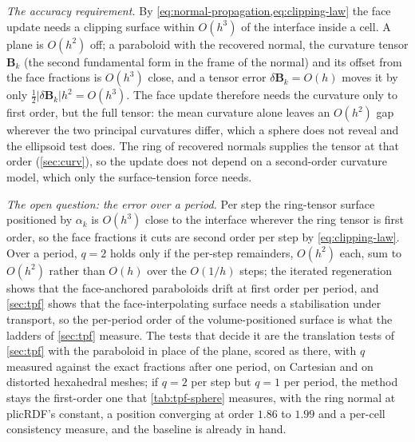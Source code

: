 \documentclass[preprint,12pt]{elsarticle}
\begin{document}
\emph{The accuracy requirement.} By \cref{eq:normal-propagation,eq:clipping-law} the face update needs a clipping surface within $O(h^3)$ of the interface inside a cell. A plane is $O(h^2)$ off; a paraboloid with the recovered normal, the curvature tensor $\mathbf{B}_k$ (the second fundamental form in the frame of the normal) and its offset from the face fractions is $O(h^3)$ close, and a tensor error $\delta\mathbf{B}_k = O(h)$ moves it by only $\tfrac12|\delta\mathbf{B}_k|h^2 = O(h^3)$. The face update therefore needs the curvature only to first order, but the full tensor: the mean curvature alone leaves an $O(h^2)$ gap wherever the two principal curvatures differ, which a sphere does not reveal and the ellipsoid test does. The ring of recovered normals supplies the tensor at that order (\cref{sec:curv}), so the update does not depend on a second-order curvature model, which only the surface-tension force needs.

\emph{The open question: the error over a period.} Per step the ring-tensor surface positioned by $\alpha_k$ is $O(h^3)$ close to the interface wherever the ring tensor is first order, so the face fractions it cuts are second order per step by \cref{eq:clipping-law}. Over a period, $q = 2$ holds only if the per-step remainders, $O(h^2)$ each, sum to $O(h^2)$ rather than $O(h)$ over the $O(1/h)$ steps; the iterated regeneration shows that the face-anchored paraboloids drift at first order per period, and \cref{sec:tpf} shows that the face-interpolating surface needs a stabilisation under transport, so the per-period order of the volume-positioned surface is what the ladders of \cref{sec:tpf} measure. The tests that decide it are the translation tests of \cref{sec:tpf} with the paraboloid in place of the plane, scored as there, with $q$ measured against the exact fractions after one period, on Cartesian and on distorted hexahedral meshes; if $q = 2$ per step but $q = 1$ per period, the method stays the first-order one that \cref{tab:tpf-sphere} measures, with the ring normal at plicRDF's constant, a position converging at order $1.86$ to $1.99$ and a per-cell consistency measure, and the baseline is already in hand.
\end{document}
